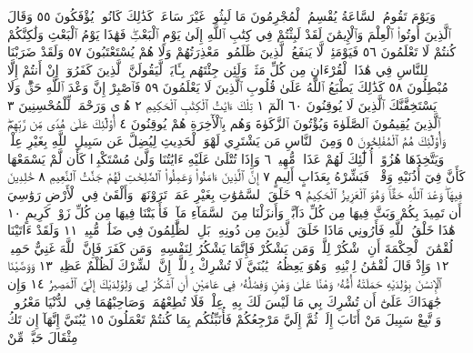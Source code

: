 وَيَوْمَ تَقُومُ ٱلسَّاعَةُ يُقْسِمُ ٱلْمُجْرِمُونَ مَا لَبِثُوا۟ غَيْرَ
سَاعَةࣲۚ كَذَٰلِكَ كَانُوا۟ يُؤْفَكُونَ ٥٥ وَقَالَ ٱلَّذِينَ أُوتُوا۟
ٱلْعِلْمَ وَٱلْإِيمَٰنَ لَقَدْ لَبِثْتُمْ فِي كِتَٰبِ ٱللَّهِ إِلَىٰ يَوْمِ ٱلْبَعْثِۖ
فَهَٰذَا يَوْمُ ٱلْبَعْثِ وَلَٰكِنَّكُمْ كُنتُمْ لَا تَعْلَمُونَ ٥٦ فَيَوْمَئِذࣲ
لَّا يَنفَعُ ٱلَّذِينَ ظَلَمُوا۟ مَعْذِرَتُهُمْ وَلَا هُمْ يُسْتَعْتَبُونَ ٥٧
وَلَقَدْ ضَرَبْنَا لِلنَّاسِ فِي هَٰذَا ٱلْقُرْءَانِ مِن كُلِّ مَثَلࣲۚ
وَلَئِن جِئْتَهُم بِـَٔايَةࣲ لَّيَقُولَنَّ ٱلَّذِينَ كَفَرُوٓا۟ إِنْ أَنتُمْ إِلَّا
مُبْطِلُونَ ٥٨ كَذَٰلِكَ يَطْبَعُ ٱللَّهُ عَلَىٰ قُلُوبِ ٱلَّذِينَ لَا يَعْلَمُونَ ٥٩
فَٱصْبِرْ إِنَّ وَعْدَ ٱللَّهِ حَقࣱّۖ وَلَا يَسْتَخِفَّنَّكَ ٱلَّذِينَ لَا يُوقِنُونَ ٦٠
الٓمٓ ١ تِلْكَ ءَايَٰتُ ٱلْكِتَٰبِ ٱلْحَكِيمِ ٢ هُدࣰى وَرَحْمَةࣰ
لِّلْمُحْسِنِينَ ٣ ٱلَّذِينَ يُقِيمُونَ ٱلصَّلَوٰةَ وَيُؤْتُونَ ٱلزَّكَوٰةَ وَهُم
بِٱلْأٓخِرَةِ هُمْ يُوقِنُونَ ٤ أُو۟لَٰٓئِكَ عَلَىٰ هُدࣰى مِّن رَّبِّهِمْۖ وَأُو۟لَٰٓئِكَ
هُمُ ٱلْمُفْلِحُونَ ٥ وَمِنَ ٱلنَّاسِ مَن يَشْتَرِي لَهْوَ ٱلْحَدِيثِ
لِيُضِلَّ عَن سَبِيلِ ٱللَّهِ بِغَيْرِ عِلْمࣲ وَيَتَّخِذَهَا هُزُوًاۚ أُو۟لَٰٓئِكَ لَهُمْ
عَذَابࣱ مُّهِينࣱ ٦ وَإِذَا تُتْلَىٰ عَلَيْهِ ءَايَٰتُنَا وَلَّىٰ مُسْتَكْبِرࣰا
كَأَن لَّمْ يَسْمَعْهَا كَأَنَّ فِيٓ أُذُنَيْهِ وَقْرࣰاۖ فَبَشِّرْهُ بِعَذَابٍ أَلِيمٍ ٧
إِنَّ ٱلَّذِينَ ءَامَنُوا۟ وَعَمِلُوا۟ ٱلصَّٰلِحَٰتِ لَهُمْ جَنَّٰتُ ٱلنَّعِيمِ ٨
خَٰلِدِينَ فِيهَاۖ وَعْدَ ٱللَّهِ حَقࣰّاۚ وَهُوَ ٱلْعَزِيزُ ٱلْحَكِيمُ ٩ خَلَقَ
ٱلسَّمَٰوَٰتِ بِغَيْرِ عَمَدࣲ تَرَوْنَهَاۖ وَأَلْقَىٰ فِي ٱلْأَرْضِ رَوَٰسِيَ أَن تَمِيدَ
بِكُمْ وَبَثَّ فِيهَا مِن كُلِّ دَآبَّةࣲۚ وَأَنزَلْنَا مِنَ ٱلسَّمَآءِ مَآءࣰ فَأَنۢبَتْنَا
فِيهَا مِن كُلِّ زَوْجࣲ كَرِيمٍ ١٠ هَٰذَا خَلْقُ ٱللَّهِ فَأَرُونِي مَاذَا
خَلَقَ ٱلَّذِينَ مِن دُونِهِۦۚ بَلِ ٱلظَّٰلِمُونَ فِي ضَلَٰلࣲ مُّبِينࣲ ١١
وَلَقَدْ ءَاتَيْنَا لُقْمَٰنَ ٱلْحِكْمَةَ أَنِ ٱشْكُرْ لِلَّهِۚ وَمَن يَشْكُرْ فَإِنَّمَا
يَشْكُرُ لِنَفْسِهِۦۖ وَمَن كَفَرَ فَإِنَّ ٱللَّهَ غَنِيٌّ حَمِيدࣱ ١٢ وَإِذْ قَالَ
لُقْمَٰنُ لِٱبْنِهِۦ وَهُوَ يَعِظُهُۥ يَٰبُنَيَّ لَا تُشْرِكْ بِٱللَّهِۖ إِنَّ ٱلشِّرْكَ
لَظُلْمٌ عَظِيمࣱ ١٣ وَوَصَّيْنَا ٱلْإِنسَٰنَ بِوَٰلِدَيْهِ حَمَلَتْهُ أُمُّهُۥ
وَهْنًا عَلَىٰ وَهْنࣲ وَفِصَٰلُهُۥ فِي عَامَيْنِ أَنِ ٱشْكُرْ لِي وَلِوَٰلِدَيْكَ
إِلَيَّ ٱلْمَصِيرُ ١٤ وَإِن جَٰهَدَاكَ عَلَىٰٓ أَن تُشْرِكَ بِي مَا لَيْسَ
لَكَ بِهِۦ عِلْمࣱ فَلَا تُطِعْهُمَاۖ وَصَاحِبْهُمَا فِي ٱلدُّنْيَا مَعْرُوفࣰاۖ
وَٱتَّبِعْ سَبِيلَ مَنْ أَنَابَ إِلَيَّۚ ثُمَّ إِلَيَّ مَرْجِعُكُمْ فَأُنَبِّئُكُم
بِمَا كُنتُمْ تَعْمَلُونَ ١٥ يَٰبُنَيَّ إِنَّهَآ إِن تَكُ مِثْقَالَ حَبَّةࣲ مِّنْ
